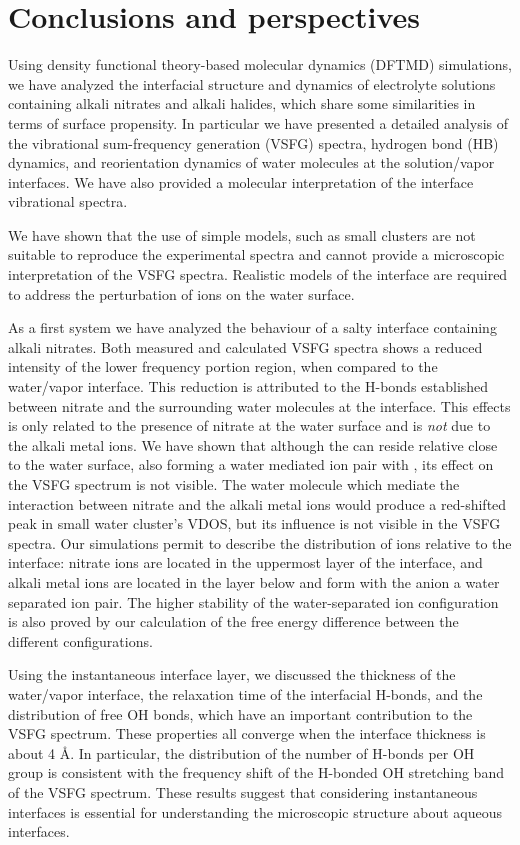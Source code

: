 \chapter{Conclusions and perspectives}\label{CHAPTER_Summary}
Using density functional theory-based molecular dynamics (DFTMD) simulations, we have analyzed the interfacial structure and dynamics of electrolyte solutions containing alkali nitrates and alkali halides,
which share some similarities in terms of surface propensity.
In particular we have presented a detailed analysis of the vibrational sum-frequency generation (VSFG) spectra, hydrogen bond (HB) dynamics, and reorientation dynamics of water molecules at the solution/vapor interfaces. 
We have also provided a molecular interpretation of the interface vibrational spectra. 


We have shown that the use of simple models, such as small clusters are not suitable to reproduce the experimental spectra 
and cannot provide a microscopic interpretation of the VSFG spectra. Realistic models of the interface are required to address the 
perturbation of ions on the water surface. 


As a first system we have analyzed the behaviour of a salty interface containing alkali nitrates.
Both measured and calculated VSFG spectra shows a reduced intensity of the lower frequency portion region, 
when compared to the water/vapor interface. 
This reduction is attributed to the H-bonds established between nitrate and the surrounding water molecules at the interface.
This effects is only related to the presence of nitrate at the water surface and is \emph{not} due to the alkali metal ions.
We have shown that although the \Li can reside relative close to the water surface, also forming a water mediated
ion pair with \nit, its effect on the VSFG spectrum is not visible. The water molecule which mediate the interaction 
between nitrate and the alkali metal ions would produce a red-shifted peak in small water cluster's VDOS, but its influence is not visible 
in the VSFG spectra. Our simulations permit to describe the distribution of ions relative to the interface: 
nitrate ions are located in the uppermost layer of the interface, and alkali metal ions are located in the layer below 
and form with the anion a water separated ion pair.
The higher stability of the water-separated ion configuration is also proved by our calculation of the free energy difference between the different configurations. 

Using the instantaneous interface layer, we discussed
the thickness of the water/vapor interface, the relaxation time of the interfacial H-bonds, 
and the distribution of free OH bonds, which have an important contribution to the VSFG spectrum.
These properties all converge when the interface thickness is about 4 \AA. 
In particular, the distribution of the number of H-bonds per OH group is consistent with the frequency shift of the H-bonded OH stretching band of the VSFG spectrum. 
These results suggest that considering instantaneous interfaces is essential for understanding the microscopic structure about aqueous interfaces.

